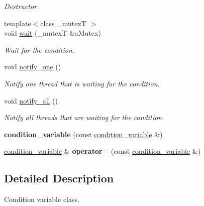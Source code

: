 \begin{DoxyCompactItemize}
\begin{DoxyCompactList}\small\item\em Destructor. \end{DoxyCompactList}\item 
{\footnotesize template$<$class \+\_\+mutexT $>$ }\\void \hyperlink{classtthread_1_1condition__variable_afe01cf1b8f5a0473bf1497b3b0d50fcb}{wait} (\+\_\+mutexT \&a\+Mutex)
\begin{DoxyCompactList}\small\item\em Wait for the condition. \end{DoxyCompactList}\item 
void \hyperlink{classtthread_1_1condition__variable_a1405d2957f6d7c4fdee5ec2d8ab16f40}{notify\+\_\+one} ()
\begin{DoxyCompactList}\small\item\em Notify one thread that is waiting for the condition. \end{DoxyCompactList}\item 
void \hyperlink{classtthread_1_1condition__variable_a9a2b021ce582091de379a4e05de5cb31}{notify\+\_\+all} ()
\begin{DoxyCompactList}\small\item\em Notify all threads that are waiting for the condition. \end{DoxyCompactList}\item 
{\bfseries condition\+\_\+variable} (const \hyperlink{classtthread_1_1condition__variable}{condition\+\_\+variable} \&)\hypertarget{classtthread_1_1condition__variable_ac2738daa234042ec9fbb2fc66332315c}{}\label{classtthread_1_1condition__variable_ac2738daa234042ec9fbb2fc66332315c}

\item 
\hyperlink{classtthread_1_1condition__variable}{condition\+\_\+variable} \& {\bfseries operator=} (const \hyperlink{classtthread_1_1condition__variable}{condition\+\_\+variable} \&)\hypertarget{classtthread_1_1condition__variable_a8e76d4025445b0e06fd5fa3fece5003d}{}\label{classtthread_1_1condition__variable_a8e76d4025445b0e06fd5fa3fece5003d}

\end{DoxyCompactItemize}


\subsection{Detailed Description}
Condition variable class. 


